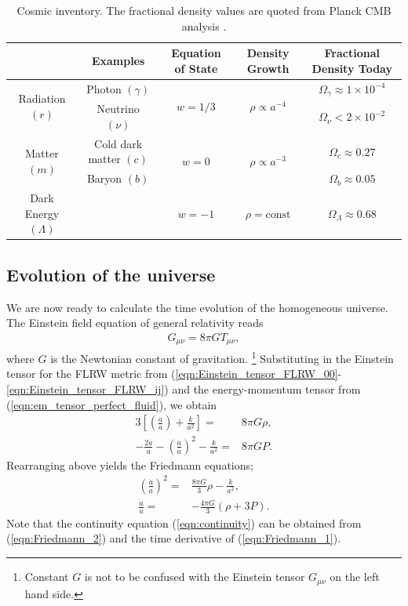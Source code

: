 \begin{table}[h]
	\caption{Cosmic inventory. The fractional density values are quoted from Planck CMB analysis \cite{PlanckCollaboration2018Parameters}.}
	\centering
	\label{table:cosmic_inventory}
	\renewcommand{\arraystretch}{1.5} 
	\begin{tabular}{c | c | c | c | c}
		& Examples & Equation of State & Density Growth & Fractional Density Today \\ 
		
		\hline
		\multirow{2}{*}{Radiation $(r)$} & Photon $(\gamma)$ & \multirow{2}{*}{$w = 1/3$} & \multirow{2}{*}{$\rho \propto a^{-4}$} & $\Omega_{\gamma} \approx 1 \times 10^{-4}$ \\
		& Neutrino $(\nu)$ & & & $\Omega_{\nu} < 2 \times 10^{-2}$ \\
		
		\hline		
		\multirow{2}{*}{Matter $(m)$} & Cold dark matter $(c)$ & \multirow{2}{*}{$w = 0$} & \multirow{2}{*}{$\rho \propto a^{-3}$} & $\Omega_{c} \approx 0.27$ \\
		& Baryon $(b)$ & & & $\Omega_{b} \approx 0.05$ \\
		
		\hline
		Dark Energy $(\Lambda)$ & & $w=-1$ & $\rho=\text{const}$  & $\Omega_\Lambda \approx 0.68$\\
		\hline 
	\end{tabular}
\end{table}


\subsection{Evolution of the universe}

We are now ready to calculate the time evolution of the homogeneous universe. The Einstein field equation of general relativity reads
\begin{align}
	G_{\mu\nu} = 8\pi G T_{\mu\nu},
\end{align}
where $G$ is the Newtonian constant of gravitation. \footnote{Constant $G$ is not to be confused with the Einstein tensor $G_{\mu\nu}$ on the left hand side.} Substituting in the Einstein tensor for the FLRW metric from (\ref{eqn:Einstein_tensor_FLRW_00}-\ref{eqn:Einstein_tensor_FLRW_ij}) and the energy-momentum tensor from (\ref{eqn:em_tensor_perfect_fluid}), we obtain
\begin{align}
	3 \left[ \left(\frac{\dot{a}}{a}\right) + \frac{k}{a^2} \right] =& 8\pi G \rho, \\
	-\frac{2\ddot{a}}{a} - \left(\frac{\dot{a}}{a}\right)^2 - \frac{k}{a^2} =& 8\pi G P.
\end{align}
Rearranging above yields the Friedmann equations;
\begin{align}
	\left(\frac{\dot{a}}{a}\right)^2 =& \frac{8\pi G}{3}\rho - \frac{k}{a^2}, \label{eqn:Friedmann_1}\\
	\frac{\ddot{a}}{a} =& - \frac{4\pi G}{3} \left(\rho + 3P\right). \label{eqn:Friedmann_2}
\end{align}
Note that the continuity equation (\ref{eqn:continuity}) can be obtained from (\ref{eqn:Friedmann_2}) and the time derivative of (\ref{eqn:Friedmann_1}).


